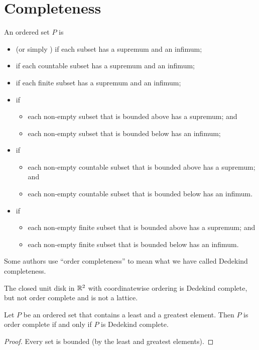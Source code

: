 \section{Completeness}
\begin{definition}
An ordered set $P$ is 
\begin{itemize}
\item {} (or simply ) if each subset has a supremum and an infimum;
\item {} if each countable subset has a supremum and an infimum;
\item {} if each finite subset has a supremum and an infimum;
\item {} if
\begin{itemize}
\item each non-empty subset that is bounded above has a supremum; and
\item each non-empty subset that is bounded below has an infimum;
\end{itemize}
\item {} if
\begin{itemize}
\item each non-empty countable subset that is bounded above has a supremum; and
\item each non-empty countable subset that is bounded below has an infimum.
\end{itemize}
\item {} if
\begin{itemize}
\item each non-empty finite subset that is bounded above has a supremum; and
\item each non-empty finite subset that is bounded below has an infimum.
\end{itemize}
\end{itemize}
\end{definition}
Some authors use ``order completeness'' to mean what we have called Dedekind completeness.

\begin{example}
The closed unit disk in $\mathbb{R}^2$ with coordinatewise ordering is Dedekind complete, but not order complete and is not a lattice.
\end{example}

\begin{lemma}
Let $P$ be an ordered set that contains a least and a greatest element. Then $P$ is order complete \textup{if and only if} $P$ is Dedekind complete.
\end{lemma}
\begin{proof}
Every set is bounded (by the least and greatest elements).
\end{proof}

